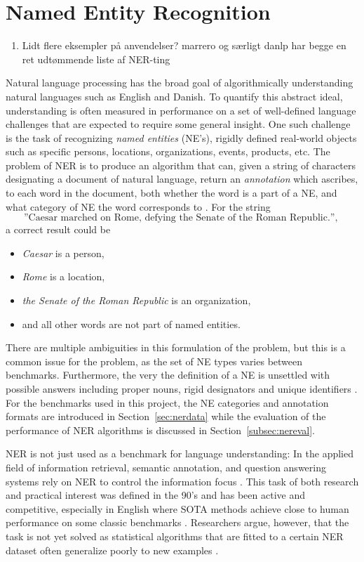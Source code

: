 \documentclass[main.tex]{subfiles}
\begin{document}
\section{Named Entity Recognition}
\begin{enumerate}
    \item Lidt flere eksempler på anvendelser? marrero og særligt danlp har begge en ret udtømmende liste af NER-ting
\end{enumerate}
Natural language processing has the broad goal of algorithmically understanding natural languages such as English and Danish.
To quantify this abstract ideal, understanding is often measured in performance on a set of well-defined language challenges that are expected to require some general insight.
One such challenge is the task of recognizing \emph{named entities} (NE's), rigidly defined real-world objects such as specific persons, locations, organizations, events, products, etc.
The problem of NER is to produce an algorithm that can, given a string of characters designating a document of natural language, return an \emph{annotation} which ascribes, to each word in the document, both whether the word is a part of a NE, and what category of NE the word corresponds to \cite{wiki2021ner}.
For the string
\[
    \text{
        ''Caesar marched on Rome, defying the Senate of the Roman Republic.'',
    }
\]
a correct result could be
\begin{itemize}
    \item \emph{Caesar} is a person,
    \item \emph{Rome} is a location,
    \item \emph{the Senate of the Roman Republic} is an organization,
    \item and all other words are not part of named entities.
\end{itemize}
There are multiple ambiguities in this formulation of the problem, but this is a common issue for the problem, as the set of NE types varies between benchmarks.
Furthermore, the very the definition of a NE is unsettled with possible answers including proper nouns, rigid designators and unique identifiers \cite[Sec. 4]{marrero2013ner}.
For the benchmarks used in this project, the NE categories and annotation formats are introduced in Section~\ref{sec:nerdata} while the evaluation of the performance of NER algorithms is discussed in Section~\ref{subsec:nereval}.

NER is not just used as a benchmark for language understanding:
In the applied field of information retrieval, semantic annotation, and question answering systems rely on NER to control the information focus \cite[Sec. 2]{marrero2013ner}.
This task of both research and practical interest was defined in the 90's and has been active and competitive, especially in English where SOTA methods achieve close to human performance on some classic benchmarks \cite{wiki2021ner, marrero2013ner}.
Researchers argue, however, that the task is not yet solved as statistical algorithms that are fitted to a certain NER dataset often generalize poorly to new examples \cite[Sec. 7.2]{marrero2013ner}.
\end{document}
